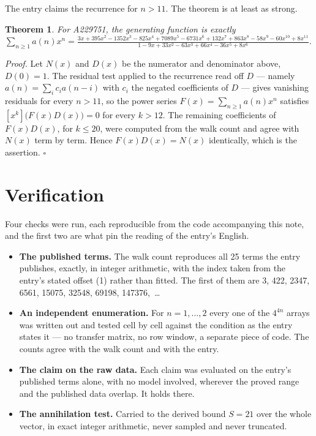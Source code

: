 \documentclass[11pt]{article}
\newtheorem{theorem}{Theorem}
\theoremstyle{definition}
\begin{document}
The entry claims the recurrence for $n > 11$. The theorem is at least as strong.

\begin{theorem} For A229751, the generating function is exactly $\sum_{n\ge 1} a(n)x^n = \frac{3x + 395x^{2} - 1352x^{3} - 825x^{4} + 7089x^{5} - 6731x^{6} + 132x^{7} + 863x^{8} - 58x^{9} - 60x^{10} + 8x^{11}}{1 - 9x + 33x^{2} - 63x^{3} + 66x^{4} - 36x^{5} + 8x^{6}}$.\end{theorem}

{\itshape Proof.} Let $N(x)$ and $D(x)$ be the numerator and denominator above, $D(0)=1$. The residual test applied to the recurrence read off $D$ --- namely $a(n) = \sum_i c_i a(n-i)$ with $c_i$ the negated coefficients of $D$ --- gives vanishing residuals for every $n > 11$, so the power series $F(x)=\sum_{n\ge 1}a(n)x^n$ satisfies $[x^k]\bigl(F(x)D(x)\bigr) = 0$ for every $k > 12$. The remaining coefficients of $F(x)D(x)$, for $k \le 20$, were computed from the walk count and agree with $N(x)$ term by term. Hence $F(x)D(x) = N(x)$ identically, which is the assertion. $\square$

\section{Verification}

Four checks were run, each reproducible from the code accompanying this note, and the first two are what pin the reading of the entry's English.

\begin{itemize}

\item {\bfseries The published terms.} The walk count reproduces all 25 terms the entry publishes, exactly, in integer arithmetic, with the index taken from the entry's stated offset (1) rather than fitted. The first of them are 3, 422, 2347, 6561, 15075, 32548, 69198, 147376,~\dots

\item {\bfseries An independent enumeration.} For $n = 1,\dots,2$ every one of the $4^{4n}$ arrays was written out and tested cell by cell against the condition as the entry states it --- no transfer matrix, no row window, a separate piece of code. The counts agree with the walk count and with the entry.

\item {\bfseries The claim on the raw data.} Each claim was evaluated on the entry's published terms alone, with no model involved, wherever the proved range and the published data overlap. It holds there.

\item {\bfseries The annihilation test.} Carried to the derived bound $S = 21$ over the whole vector, in exact integer arithmetic, never sampled and never truncated.

\end{itemize}
\end{document}
